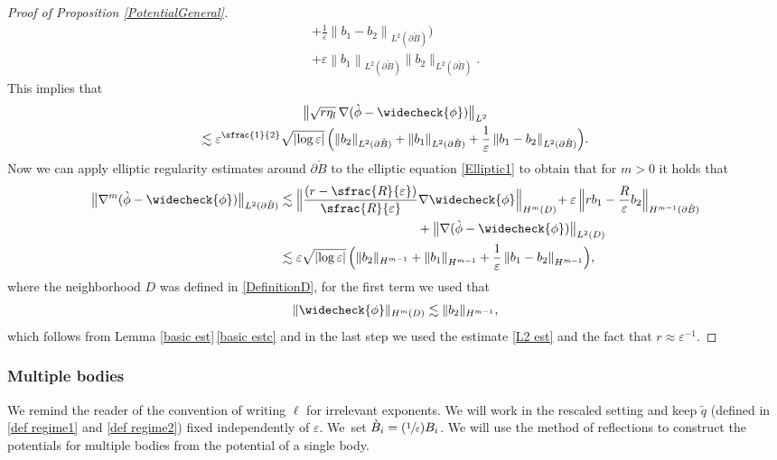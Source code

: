 \documentclass[10pt]{amsart}
\let\epsilon\varepsilon
\newcommand{\Psfrac}[2]{(\sfrac{#1}{#2})}
\theoremstyle{definition}
\newcommand\norm[1]{\left\lVert #1\right\rVert}
\newcommand\anorm[1]{\lVert #1\rVert}
\newcommand\bnorm[1]{\bigl\lVert #1\bigr\rVert}
\newcommand\Bnorm[1]{\Bigl\lVert #1\Bigr\rVert}
\let\chek\widecheck
\let\de\partial
\let\eps\epsilon
\begin{document}
\begin{proof}[Proof of Proposition \ref{PotentialGeneral}]
\begin{multline*}
{+\frac{1}{\eps}\norm{b_1-b_2}_{L^2(\de\grave{B})}\Bigr)}\\
+\eps\norm{b_1}_{L^2(\de \grave{B})}\anorm{b_2}_{L^2(\de\grave{B})}.
\end{multline*}
This implies that
\begin{multline}
\bnorm{\sqrt{r\eta_l}\,\nabla(\grave{\phi}-\chek{\phi})}_{L^2}\\
\lesssim \eps^{\sfrac{1}{2}}\sqrt{|{\log\eps}|}\,\Bigl(\anorm{b_2}_{L^2(\de\grave{B})}+\norm{b_1}_{L^2(\de\grave{B})}+\frac{1}{\eps}\norm{b_1-b_2}_{L^2(\de\grave{B})}\Bigr).\label{L2 est}
\end{multline}
Now we can apply elliptic regularity estimates around $\de \grave{B}$ to the elliptic equation \eqref{Elliptic1} to obtain that for $m>0$ it holds that
\begin{align*}
\bnorm{\nabla^m(\grave{\phi}-\chek{\phi})}_{L^2(\de\grave{B})}&\lesssim \Bnorm{\frac{(r-\sfrac{R}{\eps})}{\sfrac{R}{\eps}}\nabla\chek{\phi}}_{H^{m}(D)}\!+\eps\,\Bnorm{rb_1-\frac{R}{\eps}b_2}_{H^{m-1}(\de \grave{B})}\\
&\hspace*{3.83cm}
+\bnorm{\nabla(\grave{\phi}-\chek{\phi})}_{L^2(D)}\\
&\lesssim \eps\sqrt{|{\log\eps}|}\,\Bigl(\anorm{b_2}_{H^{m-1}}+\norm{b_1}_{H^{m-1}}+\frac{1}{\eps}\norm{b_1-b_2}_{H^{m-1}}\Bigr),
\end{align*}
where the neighborhood $D$ was defined in \eqref{DefinitionD}, for the first term we used that
\begin{align*}\anorm{\chek{\phi}}_{H^m(D)}\lesssim \anorm{b_2}_{H^{m-1}},
\end{align*}
which follows from Lemma \ref{basic est}\,\eqref{basic estc} and in the last step we used the estimate \eqref{L2 est} and the fact that $r\approx \eps^{-1}$.
\end{proof}

\subsubsection{Multiple bodies}\label{subsec mult bod}

We remind the reader of the convention of writing $\ell$ for irrelevant exponents.
We will work in the rescaled setting and keep $\tilde{q}$ (defined in \eqref{def regime1} and \eqref{def regime2}) fixed independently of $\eps$. We~set $\grave{B}_i=\Psfrac{1}{\eps}B_i$.
We will use the method of reflections to construct the potentials for multiple bodies from the potential of a single body.
\end{document}
